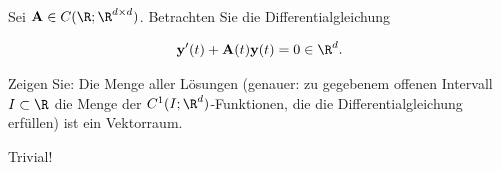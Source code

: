\begin{exercise}

Sei $\mathbf{A} \in C(\R; \R^{d \times d})$. Betrachten Sie die Differentialgleichung

\begin{align*}
  \mathbf{y}^\prime(t) + \mathbf{A}(t) \mathbf{y}(t) = 0 \in \R^d.
\end{align*}

Zeigen Sie: Die Menge aller Lösungen (genauer: zu gegebenem offenen Intervall $I \subset \R$ die Menge der $C^1(I; \R^d)$-Funktionen, die die Differentialgleichung erfüllen) ist ein Vektorraum.

\end{exercise}

\begin{solution}

Trivial!

\end{solution}
